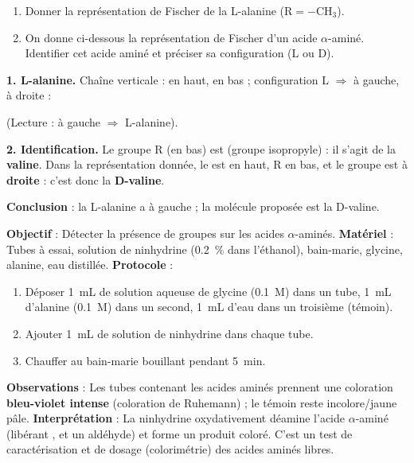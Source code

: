 \documentclass[11pt]{article}
\begin{document}
\begin{exoresolu}
\begin{enumerate}
\item Donner la représentation de Fischer de la L-alanine ($\mathrm{R} = \mathrm{-CH_3}$).
\item On donne ci-dessous la représentation de Fischer d'un acide $\alpha$-aminé. Identifier cet acide aminé et préciser sa configuration (L ou D).
\begin{center}
\end{center}
\end{enumerate}
\tcblower
\textbf{1. L-alanine.} Chaîne verticale :  en haut,  en bas ; configuration L $\Rightarrow$  à gauche,  à droite :
\begin{center}
\end{center}
(Lecture :  à gauche $\Rightarrow$ L-alanine).

\textbf{2. Identification.} Le groupe R (en bas) est  (groupe isopropyle) : il s'agit de la \textbf{valine}. Dans la représentation donnée, le  est en haut, R en bas, et le groupe  est à \textbf{droite} : c'est donc la \textbf{D-valine}.

\textbf{Conclusion} : la L-alanine a  à gauche ; la molécule proposée est la D-valine.
\end{exoresolu}

\begin{experience}
\textbf{Objectif} : Détecter la présence de groupes  sur les acides $\alpha$-aminés.
\textbf{Matériel} : Tubes à essai, solution de ninhydrine (\SI{0,2}{\%} dans l'éthanol), bain-marie, glycine, alanine, eau distillée.
\textbf{Protocole} :
\begin{enumerate}
\item Déposer \SI{1}{mL} de solution aqueuse de glycine (\SI{0,1}{M}) dans un tube, \SI{1}{mL} d'alanine (\SI{0,1}{M}) dans un second, \SI{1}{mL} d'eau dans un troisième (témoin).
\item Ajouter \SI{1}{mL} de solution de ninhydrine dans chaque tube.
\item Chauffer au bain-marie bouillant pendant \SI{5}{min}.
\end{enumerate}
\textbf{Observations} : Les tubes contenant les acides aminés prennent une coloration \textbf{bleu-violet intense} (coloration de Ruhemann) ; le témoin reste incolore/jaune pâle.
\textbf{Interprétation} : La ninhydrine oxydativement déamine l'acide $\alpha$-aminé (libérant ,  et un aldéhyde) et forme un produit coloré. C'est un test de caractérisation et de dosage (colorimétrie) des acides aminés libres.
\end{experience}
\end{document}
